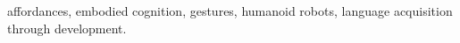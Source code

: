 \documentclass[journal]{IEEEtran}
\begin{document}
\begin{IEEEkeywords}
affordances, embodied cognition, gestures, humanoid robots, language acquisition through development.
\end{IEEEkeywords}













\appendix


\printbibliography

%
\end{document}
